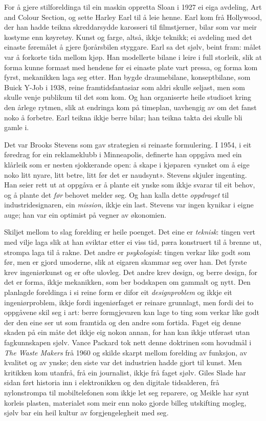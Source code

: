 For å gjere stilforeldinga til ein maskin oppretta Sloan i 1927 ei eiga avdeling, Art and Colour Section, og sette Harley Earl til å leie henne. Earl kom frå Hollywood, der han hadde teikna skreddarsydde karosseri til filmstjerner, bilar som var meir kostyme enn køyretøy. Kunst og farge, altså, ikkje teknikk; ei avdeling med det einaste føremålet å gjere fjorårsbilen styggare. Earl sa det sjølv, beint fram: målet var å forkorte tida mellom kjøp. Han modellerte bilane i leire i full storleik, slik at forma kunne formast med hendene før ei einaste plate vart pressa, og forma kom fyrst, mekanikken laga seg etter. Han bygde draumebilane, konseptbilane, som Buick Y-Job i 1938, reine framtidsfantasiar som aldri skulle seljast, men som skulle venje publikum til det som kom. Og han organiserte heile studioet kring den årlege rytmen, slik at endringa kom på timeplan, uavhengig av om det fanst noko å forbetre. Earl teikna ikkje berre bilar; han teikna takta dei skulle bli gamle i.

Det var Brooks Stevens som gav strategien si reinaste formulering. I 1954, i eit føredrag for ein reklameklubb i Minneapolis, definerte han oppgåva med ein klårleik som er nesten sjokkerande open: å skape i kjøparen «ynsket om å eige noko litt nyare, litt betre, litt før det er naudsynt». Stevens skjuler ingenting. Han seier rett ut at oppgåva er å plante eit ynske som ikkje svarar til eit behov, og å plante det \emph{før} behovet melder seg. Og han kalla dette \emph{oppdraget} til industridesignaren, ein \textit{mission}, ikkje ein last. Stevens var ingen kynikar i eigne auge; han var ein optimist på vegner av økonomien.

Skiljet mellom to slag forelding er heile poenget. Det eine er \emph{teknisk}: tingen vert med vilje laga slik at han sviktar etter ei viss tid, pæra konstruert til å brenne ut, strompa laga til å rakne. Det andre er \emph{psykologisk}: tingen verkar like godt som før, men er gjord umoderne, slik at eigaren skammar seg over han. Det fyrste krev ingeniørkunst og er ofte ulovleg. Det andre krev design, og berre design, for det er forma, ikkje mekanikken, som ber bodskapen om gammalt og nytt. Den planlagde foreldinga i si reine form er difor eit \emph{designproblem} og ikkje eit ingeniørproblem, ikkje fordi ingeniørfaget er reinare grunnlagt, men fordi dei to oppgåvene skil seg i art: berre formgjevaren kan lage to ting som verkar like godt der den eine ser ut som framtida og den andre som fortida. Faget eig denne skaden på ein måte det ikkje eig nokon annan, for han kan ikkje utførast utan fagkunnskapen sjølv. Vance Packard tok nett denne doktrinen som hovudmål i \emph{The Waste Makers} frå 1960 og skilde skarpt mellom forelding av funksjon, av kvalitet og av ynske; den siste var det industrien hadde gjort til kunst\autocite{packard1960}. Men kritikken kom utanfrå, frå ein journalist, ikkje frå faget sjølv. Giles Slade har sidan ført historia inn i elektronikken og den digitale tidsalderen, frå nylonstrompa til mobiltelefonen som ikkje let seg reparere\autocite{slade2006}, og Meikle har synt korleis plasten, materialet som meir enn noko gjorde billeg utskifting mogleg, sjølv bar ein heil kultur av forgjengelegheit med seg\autocite{meikle2005plastic}.

